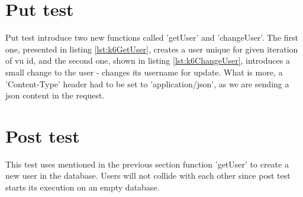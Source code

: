 \section{Put test}
Put test introduce two new functions called 'getUser' and 'changeUser'. The first one, presented in listing \ref{lst:k6GetUser}, creates a user unique for given iteration of \acrshort{vu} id, and the second one, shown in listing \ref{lst:k6ChangeUser}, introduces a small change to the user - changes its username for update. What is more, a 'Content-Type' header had to be set to 'application/json', as we are sending a \acrshort{json} content in the request.




\section{Post test}
This test uses mentioned in the previous section function 'getUser' to create a new user in the database. Users will not collide with each other since post test starts its execution on an empty database.

